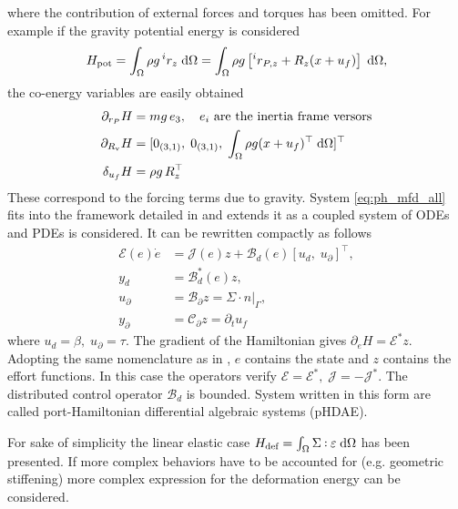where the contribution of external forces and torques has been omitted. For example if the gravity potential energy is considered
\begin{equation*}
	H_{\text{pot}} = \int_{\Omega} \rho g \, ^i r_z \d{\Omega} = \int_{\Omega} \rho g \left[ ^i r_{P, z} +R_z (x + u_f) \right] \d{\Omega},
\end{equation*}
the co-energy variables are easily obtained
\begin{align*}
\partial_{r_P}H &= m g \, e_3, \quad \text{$e_i$ are the inertia frame versors}\\
\partial_{R_\text{v}}H &= [0_{(3, 1)}, \; 0_{(3, 1)}, \; \int_{\Omega} \rho g (x + u_f)^\top \d{\Omega}]^\top \\
\delta_{u_f} H &= \rho g \, R_z^\top
\end{align*}
These correspond to the forcing terms due to gravity. System \eqref{eq:ph_mfd_all} fits into the framework detailed in \cite{mehrmann2019structurepreserving} and extends it as a coupled system of ODEs and PDEs is considered. It can be rewritten compactly as follows
\begin{equation}
\label{eq:MFD_pHDAE}
\begin{aligned}
\mathcal{E}(e) \dot{e} &= \mathcal{J}(e) z + \mathcal{B}_d(e) [u_d, \; u_\partial]^\top, \\
y_d &= \mathcal{B}_d^*(e) z, \\
u_\partial &= \mathcal{B}_{\partial} z =  \Sigma \cdot n|_{\Gamma}, \\
y_\partial &= \mathcal{C}_{\partial} z = \partial_t u_f
\end{aligned}
\end{equation}
where $u_d = \beta, \; u_\partial = \tau$. The gradient of the Hamiltonian  gives $\partial_e H = \mathcal{E}^* z$. Adopting the same nomenclature as in \cite{mehrmann2019structurepreserving}, $e$ contains the state and $z$ contains the effort functions. In this case the operators verify $\mathcal{E} = \mathcal{E}^*, \; \mathcal{J} = -\mathcal{J}^*$. The distributed control operator $\mathcal{B}_d$ is bounded. System written in this form are called port-Hamiltonian differential algebraic systems (pHDAE). 

\begin{remark}
For sake of simplicity the linear elastic case $H_{\text{def}}=\int_{\Omega} \Sigma \cddot \varepsilon \d{\Omega}$ has been presented. If more complex behaviors have to be accounted for (e.g. geometric stiffening) more complex expression for the deformation energy can be considered.
\end{remark}

